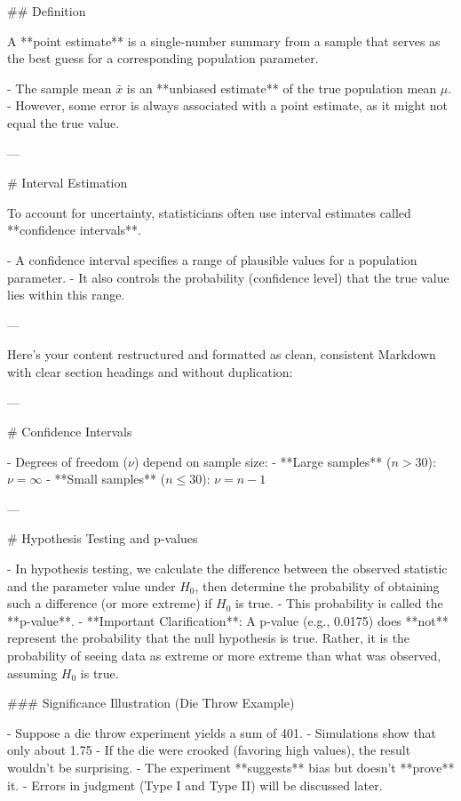 ## Definition

A **point estimate** is a single-number summary from a sample that serves as the best guess for a corresponding population parameter.

- The sample mean \( \bar{x} \) is an **unbiased estimate** of the true population mean \( \mu \).
- However, some error is always associated with a point estimate, as it might not equal the true value.

---

# Interval Estimation

To account for uncertainty, statisticians often use interval estimates called **confidence intervals**.

- A confidence interval specifies a range of plausible values for a population parameter.
- It also controls the probability (confidence level) that the true value lies within this range.

---


Here’s your content restructured and formatted as clean, consistent Markdown with clear section headings and without duplication:

---

# Confidence Intervals

- Degrees of freedom (\( \nu \)) depend on sample size:
  - **Large samples** (\( n > 30 \)): \( \nu = \infty \)
  - **Small samples** (\( n \leq 30 \)): \( \nu = n - 1 \)

---

# Hypothesis Testing and p-values

- In hypothesis testing, we calculate the difference between the observed statistic and the parameter value under \( H_0 \), then determine the probability of obtaining such a difference (or more extreme) if \( H_0 \) is true.
- This probability is called the **p-value**.
- **Important Clarification**: A p-value (e.g., 0.0175) does **not** represent the probability that the null hypothesis is true. Rather, it is the probability of seeing data as extreme or more extreme than what was observed, assuming \( H_0 \) is true.

### Significance Illustration (Die Throw Example)

- Suppose a die throw experiment yields a sum of 401.
- Simulations show that only about 1.75%
- If the die were crooked (favoring high values), the result wouldn't be surprising.
- The experiment **suggests** bias but doesn’t **prove** it.
- Errors in judgment (Type I and Type II) will be discussed later.

